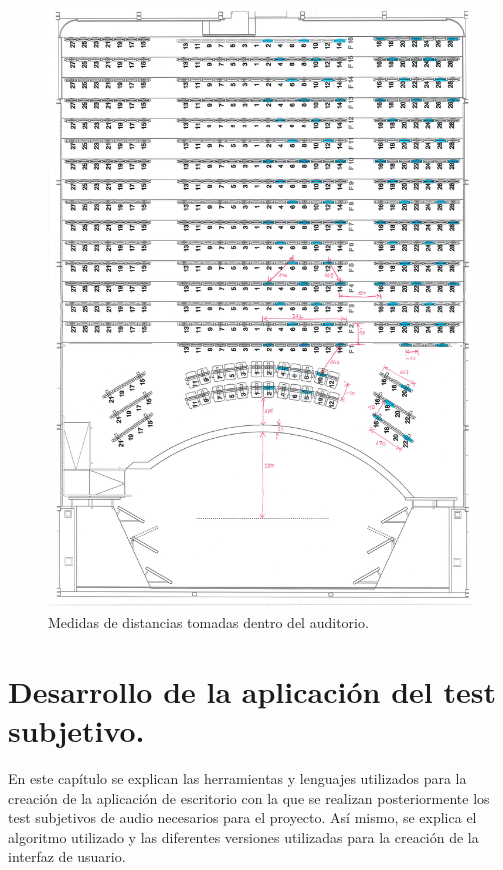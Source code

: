 \documentclass[11pt,a4paper]{book}
\begin{document}
        \begin{figure}
                \includegraphics[scale=0.4]{../imagenes/AuditorioMedidasButacas.pdf}
                \centering
                \caption{Medidas de distancias tomadas dentro del auditorio.}
                \label{fig:distancias}
            \end{figure}
            
\chapter{Desarrollo de la aplicación del test subjetivo.}
        En este capítulo se explican las herramientas y lenguajes utilizados para la creación de la aplicación de escritorio con la que se realizan posteriormente los test subjetivos de audio necesarios para el proyecto. Así mismo, se explica el algoritmo utilizado y las diferentes versiones utilizadas para la creación de la interfaz de usuario.
        
\end{document}
